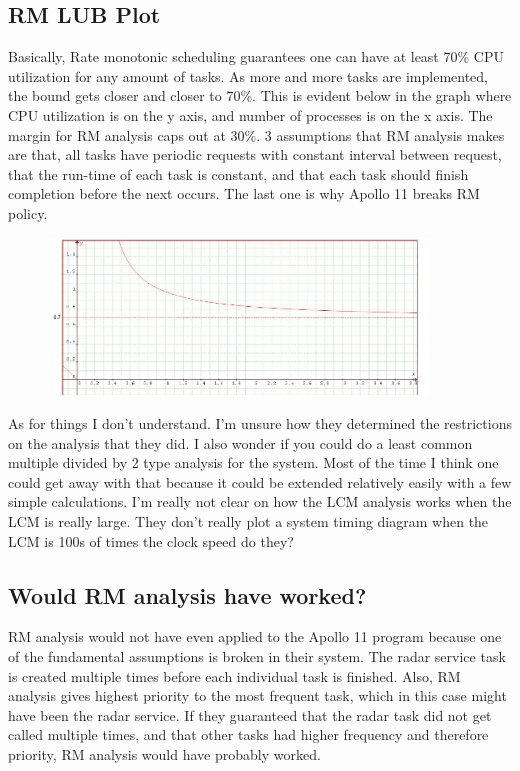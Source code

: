 \documentclass{article}
\begin{document}
\subsection*{RM LUB Plot}
Basically, Rate monotonic scheduling guarantees one can have at least 70\% CPU utilization for any amount of tasks. As more and more tasks are implemented, the bound gets closer and closer to 70\%. This is evident below in the graph where CPU utilization is on the y axis, and number of processes is on the x axis. The margin for RM analysis caps out at 30\%. 3 assumptions that RM analysis makes are that, all tasks have periodic requests with constant interval between request, that the
run-time of each task is constant, and that each task should finish completion before the next occurs. The last one is why Apollo 11 breaks RM policy.
\begin{figure}[H]
    \centering
    \includegraphics[width=0.9\textwidth]{HW1_P2.png}
\end{figure}
As for things I don't understand. I'm unsure how they determined the restrictions on the analysis that they did. I also wonder if you could do a least common multiple divided by 2 type analysis for the system. Most of the time I think one could get away with that because it could be extended relatively easily with a few simple calculations. I'm really not clear on how the LCM analysis works when the LCM is really large. They don't really plot a system timing diagram when the LCM is
100s of times the clock speed do they?


\subsection*{Would RM analysis have worked?}
RM analysis would not have even applied to the Apollo 11 program because one of the fundamental assumptions is broken in their system. The radar service task is created multiple times before each individual task is finished. Also, RM analysis gives highest priority to the most frequent task, which in this case might have been the radar service. If they guaranteed that the radar task did not get called multiple times, and that other tasks had higher frequency and therefore priority, RM analysis
would have probably worked.
\end{document}
